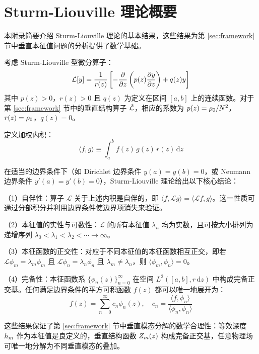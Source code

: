 \documentclass{article}
\begin{document}






\appendix

\section{Sturm-Liouville 理论概要}
\label{app:sturm_liouville}

本附录简要介绍 Sturm-Liouville 理论的基本结果，这些结果为第 \ref{sec:framework} 节中垂直本征值问题的分析提供了数学基础。

考虑 Sturm-Liouville 型微分算子：
\begin{equation}
    \mathcal{L}[y] = \frac{1}{r(z)}\left[-\pde{}{z}\left(p(z)\pde{y}{z}\right) + q(z)y\right]
\end{equation}
其中 $p(z) > 0$，$r(z) > 0$ 且 $q(z)$ 为定义在区间 $[a, b]$ 上的连续函数。对于第 \ref{sec:framework} 节中的垂直结构算子 $\hat{\mathcal{L}}$，相应的系数为 $p(z) = \rho_0/N^2$，$r(z) = \rho_0$，$q(z) = 0$。

定义加权内积：
\begin{equation}
    \langle f, g \rangle \equiv \int_a^b f(z)\, g(z)\, r(z)\, \mathrm{d}z
\end{equation}

在适当的边界条件下（如 Dirichlet 边界条件 $y(a) = y(b) = 0$，或 Neumann 边界条件 $y'(a) = y'(b) = 0$），Sturm-Liouville 理论给出以下核心结论：

（1）自伴性：算子 $\mathcal{L}$ 关于上述内积是自伴的，即 $\langle f, \mathcal{L}g \rangle = \langle \mathcal{L}f, g \rangle$。这一性质可通过分部积分并利用边界条件使边界项消失来验证。

（2）本征值的实性与可数性：$\mathcal{L}$ 的所有本征值 $\lambda_n$ 均为实数，且可按大小排列为递增序列 $\lambda_0 < \lambda_1 < \lambda_2 < \cdots \to \infty$。

（3）本征函数的正交性：对应于不同本征值的本征函数相互正交，即若 $\mathcal{L}\phi_m = \lambda_m \phi_m$ 且 $\mathcal{L}\phi_n = \lambda_n \phi_n$ 且 $\lambda_m \neq \lambda_n$，则 $\langle \phi_m, \phi_n \rangle = 0$。

（4）完备性：本征函数系 $\{\phi_n(z)\}_{n=0}^\infty$ 在空间 $L^2([a, b], r\,\mathrm{d}z)$ 中构成完备正交基。任何满足边界条件的平方可积函数 $f(z)$ 都可以唯一地展开为：
\begin{equation}
    f(z) = \sum_{n=0}^{\infty} c_n \phi_n(z), \quad c_n = \frac{\langle f, \phi_n \rangle}{\langle \phi_n, \phi_n \rangle}
\end{equation}

这些结果保证了第 \ref{sec:framework} 节中垂直模态分解的数学合理性：等效深度 $h_m$ 作为本征值是良定义的，垂直结构函数 $Z_m(z)$ 构成完备正交基，任意物理场可唯一地分解为不同垂直模态的叠加。

\end{document}
